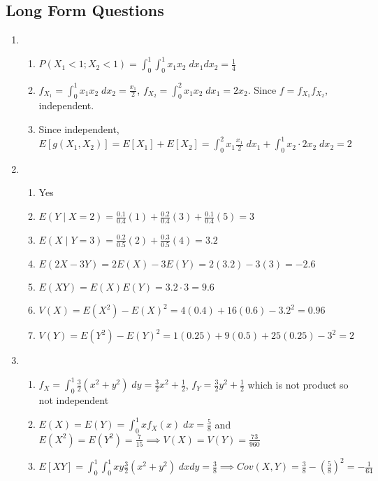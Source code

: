 \documentclass[12pt, a4paper]{article}
\begin{document}
\subsection*{Long Form Questions}
\begin{enumerate}[Q\arabic*.]
  \item 
    \begin{enumerate}[(\roman*)]
      \item $P(X_1<1;X_2<1) = \int^1_0\int^1_0 x_1x_2\;dx_1dx_2 = \frac{1}{4}$

      \item $f_{X_1} = \int^1_0x_1x_2\;dx_2= \frac{x_1}{2}$, $f_{X_2} = \int^2_0x_1x_2\;dx_1= 2x_2$. Since $f = f_{X_1}f_{X_2}$, independent.

      \item Since independent, $E[g(X_1, X_2)] = E[X_1] + E[X_2] = \int_0^2x_1\frac{x_1}{2}\;dx_1 + \int^1_0x_2\cdot 2x_2\;dx_2 = 2$
    \end{enumerate}

  \item 
    \begin{enumerate}[(\roman*)]
      \item Yes
      \item $E(Y\mid X=2) = \frac{0.1}{0.4}(1) + \frac{0.2}{0.4}(3) + \frac{0.1}{0.4}(5) = 3$
      \item $E(X\mid Y=3) = \frac{0.2}{0.5}(2) + \frac{0.3}{0.5}(4) = 3.2$
      \item $E(2X-3Y) = 2E(X) - 3E(Y) = 2(3.2) - 3(3) = -2.6$
      \item $E(XY) = E(X)E(Y) = 3.2\cdot 3 = 9.6$
      \item $V(X) = E(X^2) - E(X)^2 = 4(0.4) + 16(0.6) - 3.2^2 = 0.96$
      \item $V(Y) = E(Y^2) - E(Y)^2 = 1(0.25) + 9(0.5) + 25(0.25) - 3^2 = 2$
    \end{enumerate}

  \item 
    \begin{enumerate}[(\roman*)]
      \item $f_X = \int^1_0 \frac{3}{2}(x^2 +y^2)\;dy = \frac{3}{2}x^2+\frac{1}{2}$, $f_Y = \frac{3}{2}y^2+\frac{1}{2}$ which is not product so not independent

      \item $E(X) = E(Y) = \int^1_0 xf_X(x) \;dx = \frac{5}{8}$ and $E(X^2) =E(Y^2)= \frac{7}{15} \implies V(X) = V(Y) = \frac{73}{960}$

      \item $E[XY] = \int_0^1\int_0^1 xy \frac{3}{2}(x^2+y^2)\;dxdy = \frac{3}{8} \implies Cov(X,Y) = \frac{3}{8} - (\frac{5}{8})^2 = -\frac{1}{64}$


\end{enumerate}
\end{enumerate}
\end{document}
